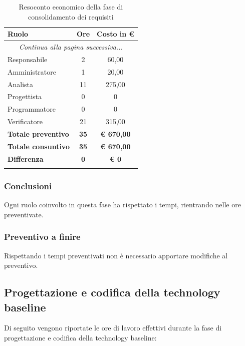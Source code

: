 \documentclass[../piano_di_progetto.tex]{subfiles}
\begin{document}
\begin{center}
	\begin{longtable}{|l|c|c|}
		\hline
		\rowcolor{lightgray}
		\textbf{Ruolo} & \textbf{Ore} & \textbf{Costo in €}\\
		\hline
		\endhead
		
		\hline
		\multicolumn{3}{|c|}{\emph{Continua alla pagina successiva...}}\\
		\hline
		\endfoot

		\endlastfoot
		Responsabile & 	 2 	 & 60,00 \\
		Amministratore & 1 	 & 20,00 \\
		Analista & 		11 	 & 275,00 \\
		Progettista &    0   & 0 \\
		Programmatore &  0   & 0 \\
		Verificatore &   21  & 315,00 \\
		\hline
		\textbf{Totale preventivo} & \textbf{35} & \textbf{€ 670,00} \\
		\hline
		\textbf{Totale consuntivo} & \textbf{35} & \textbf{€ 670,00} \\
		\hline
		\textbf{Differenza} & \textbf{0} & \textbf{€ 0}\\
		\hline
		\rowcolor{white}
		\caption{Resoconto economico della fase di consolidamento dei requisiti}
	\end{longtable}
\end{center}

\subsubsection{Conclusioni}%
\label{sub:cons_con_2}
Ogni ruolo coinvolto in questa fase ha rispettato i tempi, rientrando nelle ore preventivate.

\subsubsection{Preventivo a finire}
\label{sub:cons_prev_fine_2}
Rispettando i tempi preventivati non è necessario apportare modifiche al preventivo. \\

\subsection{Progettazione e codifica della technology baseline}%
\label{sub:cons_prog_tech}
Di seguito vengono riportate le ore di lavoro effettivi durante la fase di progettazione e codifica della technology baseline: \\
\end{document}
